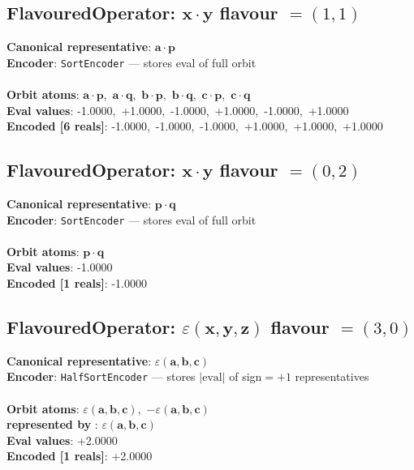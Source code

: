 \documentclass[a4paper,11pt]{article}
\newcommand{\pdcegfomjfhook}[2]{\mathbf{#1} \cdot \mathbf{#2}}
\newcommand{\kblbmcpggoncpf}[3]{\varepsilon(\mathbf{#1},\mathbf{#2},\mathbf{#3})}
\begin{document}
\subsection{FlavouredOperator: $\pdcegfomjfhook{x}{y}$  flavour $= (1, 1)$}
\textbf{  Canonical representative}: $\displaystyle\pdcegfomjfhook{a}{p}$\\
\textbf{  Encoder}: \texttt{SortEncoder} — stores eval of full orbit\\\\
\textbf{  Orbit atoms}: $\pdcegfomjfhook{a}{p}$,\ $\pdcegfomjfhook{a}{q}$,\ $\pdcegfomjfhook{b}{p}$,\ $\pdcegfomjfhook{b}{q}$,\ $\pdcegfomjfhook{c}{p}$,\ $\pdcegfomjfhook{c}{q}$\\
\textbf{  Eval values}: -1.0000,\ +1.0000,\ -1.0000,\ +1.0000,\ -1.0000,\ +1.0000\\
\textbf{  Encoded [6 reals]}: -1.0000,\ -1.0000,\ -1.0000,\ +1.0000,\ +1.0000,\ +1.0000\\

\subsection{FlavouredOperator: $\pdcegfomjfhook{x}{y}$  flavour $= (0, 2)$}
\textbf{  Canonical representative}: $\displaystyle\pdcegfomjfhook{p}{q}$\\
\textbf{  Encoder}: \texttt{SortEncoder} — stores eval of full orbit\\\\
\textbf{  Orbit atoms}: $\pdcegfomjfhook{p}{q}$\\
\textbf{  Eval values}: -1.0000\\
\textbf{  Encoded [1 reals]}: -1.0000\\

\subsection{FlavouredOperator: $\kblbmcpggoncpf{x}{y}{z}$  flavour $= (3, 0)$}
\textbf{  Canonical representative}: $\displaystyle\kblbmcpggoncpf{a}{b}{c}$\\
\textbf{  Encoder}: \texttt{HalfSortEncoder} — stores $|\text{eval}|$ of sign$=+1$ representatives\\\\
\textbf{  Orbit atoms}: $\kblbmcpggoncpf{a}{b}{c}$,\ $-\kblbmcpggoncpf{a}{b}{c}$\\
\textbf{  represented by }: $\kblbmcpggoncpf{a}{b}{c}$\\
\textbf{  Eval values}: +2.0000\\
\textbf{  Encoded [1 reals]}: +2.0000\\
\end{document}
